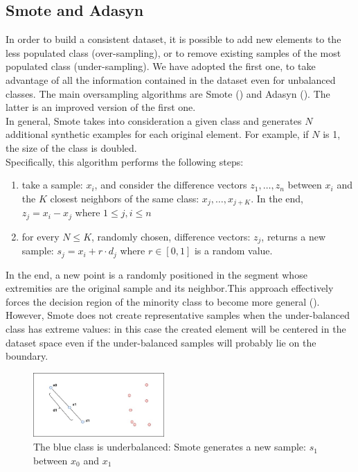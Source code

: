 \documentclass[LaM,binding=0.6cm]{sapthesis}
\begin{document}
\subsection{Smote and Adasyn}
In order to build a consistent dataset, it is possible to add new elements to the less populated class (over-sampling), or to remove existing samples of the most populated class (under-sampling). We have adopted the first one, 
to take advantage of all the information contained in the dataset even for unbalanced classes. The main oversampling algorithms are Smote (\cite{smotepaper}) and Adasyn (\cite{conf/ijcnn/HeBGL08}). The latter is an improved version of the first one. \\In general, Smote takes into consideration a given class and generates $N$ additional synthetic examples for each original element. For example, if $N$ is 1, the size of the class is doubled.\\Specifically, this algorithm performs the following steps:
\begin{enumerate}
\item take a sample: $x_i$, and consider the difference vectors $z_1,\dots,z_n$ between $x_i$ and the $K$ closest neighbors of the same class: ${x_j,\dots,x_{j+K}}$. In the end, $z_j = x_i - x_j$  where $1\leq j,i\leq n$
\item for every $N\leq K$, randomly chosen, difference vectors: $z_j$, returns a new sample: $s_j = x_i+r\cdot d_j$ where $r \in [0,1]$ is a random value.
\end{enumerate}
In the end, a new point is a randomly positioned in the segment whose extremities are the original sample and its neighbor.This approach effectively forces the decision region of the minority class to become more general (\cite{smotepaper}). However, Smote does not create representative samples when the under-balanced class has extreme values: in this case the created element will be centered in the dataset space even if the under-balanced samples will probably lie on the boundary.
\begin{figure}[H]
	\includegraphics[width=50mm,scale=0.7]{smoteex.png}
	\caption{The blue class is underbalanced: Smote generates a new sample: $s_1$ between $x_0$ and $x_1$}
	\label{fig:smoteex}
\end{figure}
\end{document}
